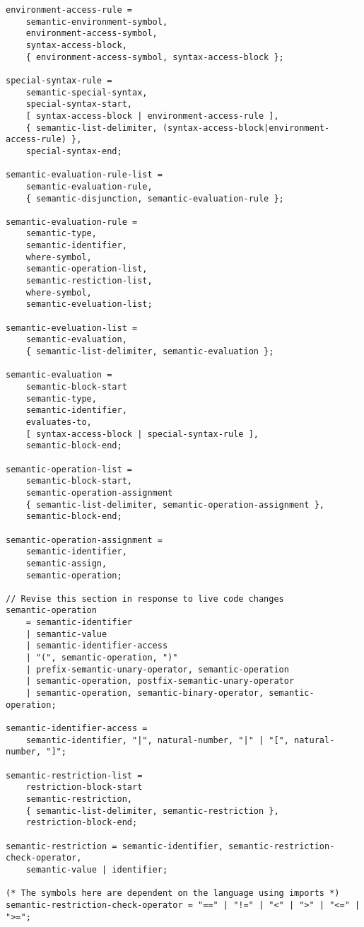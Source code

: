 \begin{verbatim}
environment-access-rule = 
    semantic-environment-symbol,
    environment-access-symbol,
    syntax-access-block,
    { environment-access-symbol, syntax-access-block };

special-syntax-rule = 
    semantic-special-syntax,
    special-syntax-start,
    [ syntax-access-block | environment-access-rule ],
    { semantic-list-delimiter, (syntax-access-block|environment-access-rule) },
    special-syntax-end;

semantic-evaluation-rule-list = 
    semantic-evaluation-rule,
    { semantic-disjunction, semantic-evaluation-rule };

semantic-evaluation-rule = 
    semantic-type,
    semantic-identifier,
    where-symbol,
    semantic-operation-list,
    semantic-restiction-list,
    where-symbol, 
    semantic-eveluation-list;

semantic-eveluation-list = 
    semantic-evaluation,
    { semantic-list-delimiter, semantic-evaluation };

semantic-evaluation = 
    semantic-block-start
    semantic-type, 
    semantic-identifier,
    evaluates-to,
    [ syntax-access-block | special-syntax-rule ],
    semantic-block-end;

semantic-operation-list = 
    semantic-block-start,
    semantic-operation-assignment
    { semantic-list-delimiter, semantic-operation-assignment },
    semantic-block-end;

semantic-operation-assignment =
    semantic-identifier,
    semantic-assign,
    semantic-operation;

// Revise this section in response to live code changes
semantic-operation 
    = semantic-identifier
    | semantic-value
    | semantic-identifier-access
    | "(", semantic-operation, ")"
    | prefix-semantic-unary-operator, semantic-operation
    | semantic-operation, postfix-semantic-unary-operator
    | semantic-operation, semantic-binary-operator, semantic-operation;

semantic-identifier-access = 
    semantic-identifier, "|", natural-number, "|" | "[", natural-number, "]";

semantic-restriction-list = 
    restriction-block-start
    semantic-restriction,
    { semantic-list-delimiter, semantic-restriction },
    restriction-block-end;

semantic-restriction = semantic-identifier, semantic-restriction-check-operator,
    semantic-value | identifier;

(* The symbols here are dependent on the language using imports *)
semantic-restriction-check-operator = "==" | "!=" | "<" | ">" | "<=" | ">=";


\end{verbatim}
